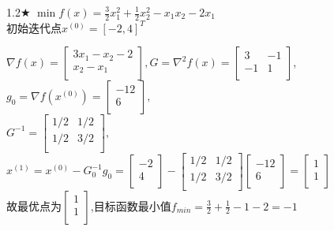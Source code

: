 \begin{problem}{1.2$\bigstar$}
    $\min f(x)=\frac{3}{2}x_1^2+\frac{1}{2}x_2^2-x_1x_2-2x_1$\\
    初始迭代点${x^{(0)}}=[-2,4]^T$
\end{problem}
\begin{solution}
    $\nabla f(x)=\begin{bmatrix}
        3x_1-x_2-2  \\
        x_2-x_1  \\
    \end{bmatrix}, G=\nabla^2 f(x)=\begin{bmatrix}
        3   & -1  \\
        -1  & 1  \\
    \end{bmatrix}$,\\
    $g_0=\nabla f(x^{(0)})=\begin{bmatrix} -12\\6\\\end{bmatrix},$\\
    $G^{-1}=\begin{bmatrix}
        1/2 & 1/2\\
        1/2 & 3/2\\
    \end{bmatrix},$\\
    $x^{(1)}=x^{(0)}-G_0^{-1}g_0=\begin{bmatrix} -2\\4\\\end{bmatrix}-\begin{bmatrix}
        1/2 & 1/2\\
        1/2 & 3/2\\
    \end{bmatrix}\begin{bmatrix} -12\\6\\\end{bmatrix}=\begin{bmatrix} 1\\1\\\end{bmatrix}$\\
    故最优点为$\begin{bmatrix} 1\\1\\\end{bmatrix}$,目标函数最小值$f_{min}=\frac{3}{2}+\frac{1}{2}-1-2=-1$
\end{solution}

